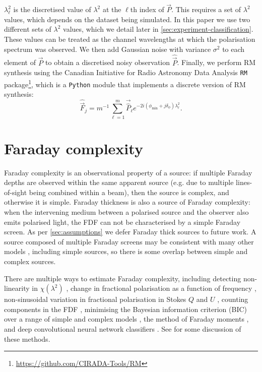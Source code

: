     $\lambda^2_\ell$ is the discretised value of $\lambda^2$ at the $\ell$th index of $\vec P$. This requires a set of $\lambda^2$ values, which depends on the dataset being simulated. In this paper we use two different sets of $\lambda^2$ values, which we detail later in \autoref{sec:experiment-classification}. These values can be treated as the channel wavelengths at which the polarisation spectrum was observed. We then add Gaussian noise with variance $\sigma^2$ to each element of $\vec P$ to obtain a discretised noisy observation $\hat{\vec{P}}$. Finally, we perform RM synthesis using the Canadian Initiative for Radio Astronomy Data Analysis \texttt{RM} package\footnote{\url{https://github.com/CIRADA-Tools/RM}}, which is a \texttt{Python} module that implements a discrete version of RM synthesis:
    \begin{equation}
      \label{eq:faraday-discrete-rm-synthesis}
      \hat{\vec{F}}_j = m^{-1} \sum_{\ell = 1}^m \vec{\hat P}_\ell e^{-2i(\phi_{\min} + j\delta_\phi)\lambda^2_\ell}.
    \end{equation}

\section{Faraday complexity}

    Faraday complexity is an observational property of a source: if multiple Faraday depths are observed within the same apparent source (e.g. due to multiple lines-of-sight being combined within a beam), then the source is complex, and otherwise it is simple. Faraday thickness is also a source of Faraday complexity: when the intervening medium between a polarised source and the observer also emits polarised light, the FDF can not be characterised by a simple Faraday screen. As per \autoref{sec:assumptions} we defer Faraday thick sources to future work. A source composed of multiple Faraday screens may be consistent with many other models \citep{sun15comparison}, including simple sources, so there is some overlap between simple and complex sources.

    There are multiple ways to estimate Faraday complexity, including detecting non-linearity in $\chi(\lambda^2)$ \citep{goldstein84faraday}, change in fractional polarisation as a function of frequency \citep{farnes14broadband}, non-sinusoidal variation in fractional polarisation in Stokes $Q$ and $U$ \citep{osullivan12agn}, counting components in the FDF \citep{law11faraday}, minimising the Bayesian information criterion (BIC) over a range of simple and complex models \citep[called `QU fitting'][]{osullivan_broad-band_2017}, the method of Faraday moments \citep{anderson_broadband_2015,Brown11report}, and deep convolutional neural network classifiers \citep[CNNs;][]{brown_classifying_2018}. See \citep{sun15comparison} for some discussion of these methods.

